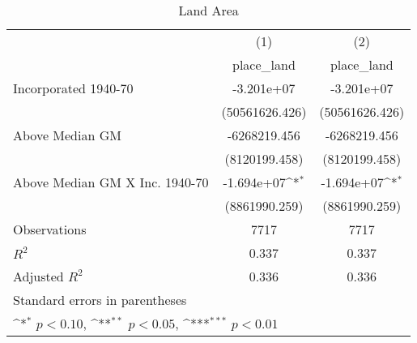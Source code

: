 \begin{table}[htbp]\centering
\def\sym#1{\ifmmode^{#1}\else\(^{#1}\)\fi}
\caption{Land Area}
\begin{tabular}{l*{2}{c}}
\hline\hline
                    &\multicolumn{1}{c}{(1)}&\multicolumn{1}{c}{(2)}\\
                    &\multicolumn{1}{c}{place\_land}&\multicolumn{1}{c}{place\_land}\\
\hline
Incorporated 1940-70&  -3.201e+07         &  -3.201e+07         \\
                    &(50561626.426)         &(50561626.426)         \\
[1em]
Above Median GM     &-6268219.456         &-6268219.456         \\
                    &(8120199.458)         &(8120199.458)         \\
[1em]
Above Median GM X Inc. 1940-70&  -1.694e+07\sym{*}  &  -1.694e+07\sym{*}  \\
                    &(8861990.259)         &(8861990.259)         \\
\hline
Observations        &        7717         &        7717         \\
\(R^{2}\)           &       0.337         &       0.337         \\
Adjusted \(R^{2}\)  &       0.336         &       0.336         \\
\hline\hline
\multicolumn{3}{l}{\footnotesize Standard errors in parentheses}\\
\multicolumn{3}{l}{\footnotesize \sym{*} \(p<0.10\), \sym{**} \(p<0.05\), \sym{***} \(p<0.01\)}\\
\end{tabular}
\end{table}
